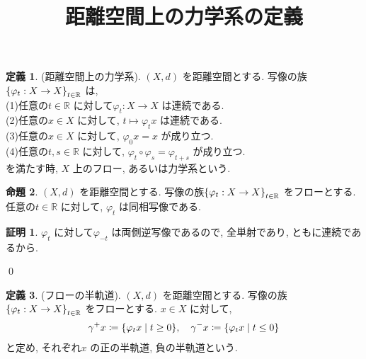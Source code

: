 \documentclass[10pt, fleqn, label-section=none]{bxjsarticle}
\title{距離空間上の力学系の定義}
\date{}
\author{}
\theoremstyle{definition}
\newtheorem{dfn}{定義}[section]
\newtheorem{prop}[dfn]{命題}
\newtheorem*{pf*}{証明}
\newcommand{\cbra}[1]{\mleft\{#1\mright\}}
\renewcommand{\;}{\, ; \,}
\begin{document}
\maketitle

\section{}

\subsection{}

\begin{dfn}(距離空間上の力学系). $(X, d)$ を距離空間とする. 写像の族$\cbra{\varphi_t : X \rightarrow X}_{t \in \mathbb R}$ は, \\
(1)任意の$t \in \mathbb R$ に対して$\varphi_t : X \rightarrow X$ は連続である. \\
(2)任意の$x \in X$ に対して, $t \mapsto \varphi_t x$ は連続である. \\
(3)任意の$x \in X$ に対して, $\varphi_0 x = x$ が成り立つ. \\
(4)任意の$t, s \in \mathbb R$ に対して, $\varphi_t \circ \varphi_s = \varphi_{t +s}$ が成り立つ. \\
を満たす時, $X$ 上のフロー, あるいは力学系という. 

\end{dfn}

\begin{prop} $(X, d)$ を距離空間とする. 写像の族$\cbra{\varphi_t : X \rightarrow X}_{t \in \mathbb R}$ をフローとする. 任意の$t \in \mathbb R$ に対して, $\varphi_t$ は同相写像である. 

\end{prop}
\begin{pf*}$\varphi_t $ に対して$\varphi_{-t}$ は両側逆写像であるので, 全単射であり, ともに連続であるから. 

\qed
\end{pf*}


\begin{dfn}(フローの半軌道). $(X, d)$ を距離空間とする. 写像の族$\cbra{\varphi_t : X \rightarrow X}_{t \in \mathbb R}$ をフローとする. $x \in X$ に対して, 
\begin{align*} \gamma^+ x \coloneqq \cbra{\varphi_t x \mid t \geq 0 }   , \quad \gamma^- x \coloneqq  \cbra{\varphi_t x \mid t \leq 0 } \end{align*}
と定め, それぞれ$x$ の正の半軌道, 負の半軌道という. 

\end{dfn}
\end{document}
